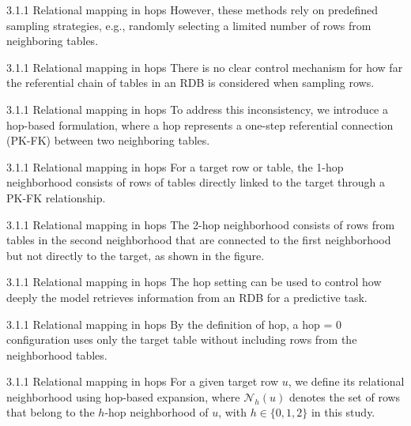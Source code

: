 \documentclass[aspectratio=169,10pt]{beamer}
\begin{document}
\begin{frame}{3.1.1 Relational mapping in hops}
However, these methods rely on predefined sampling strategies, e.g., randomly selecting a limited number of rows from neighboring tables.
\end{frame}

\begin{frame}{3.1.1 Relational mapping in hops}
There is no clear control mechanism for how far the referential chain of tables in an RDB is considered when sampling rows.
\end{frame}

\begin{frame}{3.1.1 Relational mapping in hops}
To address this inconsistency, we introduce a hop-based formulation, where a hop represents a one-step referential connection (PK-FK) between two neighboring tables.
\end{frame}

\begin{frame}{3.1.1 Relational mapping in hops}
For a target row or table, the 1-hop neighborhood consists of rows of tables directly linked to the target through a PK-FK relationship.
\end{frame}

\begin{frame}{3.1.1 Relational mapping in hops}
The 2-hop neighborhood consists of rows from tables in the second neighborhood that are connected to the first neighborhood but not directly to the target, as shown in the figure.
\end{frame}

\begin{frame}{3.1.1 Relational mapping in hops}
The hop setting can be used to control how deeply the model retrieves information from an RDB for a predictive task.
\end{frame}

\begin{frame}{3.1.1 Relational mapping in hops}
By the definition of hop, a hop = 0 configuration uses only the target table without including rows from the neighborhood tables.
\end{frame}

\begin{frame}{3.1.1 Relational mapping in hops}
For a given target row $u$, we define its relational neighborhood using hop-based expansion, where $\mathcal{N}_h(u)$ denotes the set of rows that belong to the $h$-hop neighborhood of $u$, with $h \in \{0,1,2\}$ in this study.
\end{frame}
\end{document}
